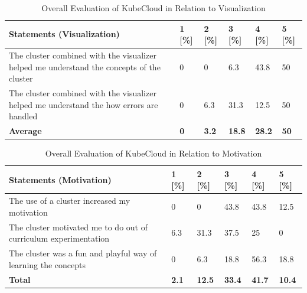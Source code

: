 \begin{table}[H]
\centering
\begin{tabular}{|p{9cm}|p{0.8cm}|p{0.8cm}|p{0.8cm}|p{0.8cm}|p{0.8cm}|}
\hline
\rowcolor[HTML]{EFEFEF} 
\textbf{Statements (Visualization)}             & \textbf{1} [\%] & \textbf{2} [\%] & \textbf{3} [\%] & \textbf{4} [\%] & \textbf{5} [\%]   \\ \hline
The cluster combined with the visualizer helped me understand the concepts of the cluster		 &  0 & 0 & 6.3 & 43.8 & 50     	 	\\ \hline
The cluster combined with the visualizer helped me understand the how errors are handled		&     0 & 6.3 & 31.3 & 12.5 & 50	 	\\ \hline
\rowcolor[HTML]{EFEFEF} 
\textbf{Average}             	 & \textbf{0} & \textbf{3.2} & \textbf{18.8} & \textbf{28.2} & \textbf{50}   \\ \hline
\end{tabular}
\caption{Overall Evaluation of KubeCloud in Relation to Visualization}
\label{table:overallevaluationclustervisualization}
\end{table}

\vspace{-5mm}

\begin{table}[H]
\centering
\begin{tabular}{|p{9cm}|p{0.8cm}|p{0.8cm}|p{0.8cm}|p{0.8cm}|p{0.8cm}|}
\hline
\rowcolor[HTML]{EFEFEF} 
\textbf{Statements (Motivation)}             & \textbf{1} [\%] & \textbf{2} [\%] & \textbf{3} [\%] & \textbf{4} [\%] & \textbf{5} [\%]   \\ \hline
The use of a cluster increased my motivation		 & 0 & 0 & 43.8 & 43.8 & 12.5	 	\\ \hline
The cluster motivated me to do out of curriculum experimentation	& 6.3 & 31.3 & 37.5 & 25 & 0 	 	\\ \hline
The cluster was a fun and playful way of learning the concepts	& 0 & 6.3 & 18.8 & 56.3 & 18.8   	 	\\ \hline
\rowcolor[HTML]{EFEFEF} 
\textbf{Total}             	 & \textbf{2.1} & \textbf{12.5} & \textbf{33.4} & \textbf{41.7} & \textbf{10.4}   \\ \hline
\end{tabular}
\caption{Overall Evaluation of KubeCloud in Relation to Motivation}
\label{table:overallevaluationclustermotivation}
\end{table}

\vspace{-5mm}

